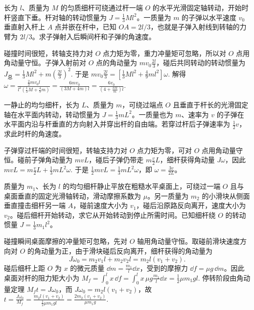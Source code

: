 \documentclass[lang=cn,11pt]{elegantbook}
\begin{document}
\begin{exercise}
长为 \(l\)、质量为 \(M\) 的匀质细杆可绕通过杆一端 \(O\) 的水平光滑固定轴转动，开始时杆竖直下垂。杆对轴的转动惯量为 \(J=\frac13Ml^2\)。一质量为 \(m\) 的子弹以水平速度 \(v_0\) 垂直射入杆上 \(A\) 点并嵌在杆中，已知 \(OA=2l/3\)，也就是子弹入射线到转轴的力臂为 \(2l/3\)。求子弹射入后瞬间杆和子弹的角速度。
\end{exercise}

\begin{solution}
碰撞时间很短，转轴支持力对 \(O\) 点力矩为零，重力冲量矩可忽略，所以对 \(O\) 点用角动量守恒。子弹入射前对 \(O\) 点的角动量为 \(mv_0\frac{2l}{3}\)，碰后共同转动的转动惯量为
 \(J_{\text{总}}=\frac13Ml^2+m\left(\frac{2l}{3}\right)^2.\) 
于是
 \(mv_0\frac{2l}{3} =\left[\frac13Ml^2+\frac49ml^2\right]\omega.\) 
解得
 \(\omega =\frac{\frac23mv_0l}{l^2\left(\frac13M+\frac49m\right)} =\frac{6mv_0}{(3M+4m)l} =\frac{6v_0}{\left(4+\frac{3M}{m}\right)l}.\) 
\end{solution}

\begin{exercise}
一静止的均匀细杆，长为 \(L\)、质量为 \(m\)，可绕过端点 \(O\) 且垂直于杆长的光滑固定轴在水平面内转动，转动惯量为 \(J=\frac13mL^2\)。一质量也为 \(m\)、速率为 \(v\) 的子弹在水平面内沿与杆垂直的方向射入并穿出杆的自由端。若穿过杆后子弹速率为 \(\frac12v\)，求此时杆的角速度。
\end{exercise}

\begin{solution}
子弹穿过杆端的时间很短，转轴支持力对 \(O\) 点力矩为零，可对 \(O\) 点用角动量守恒。碰前子弹角动量为 \(mvL\)，碰后子弹仍带走 \(m\frac{v}{2}L\)，细杆获得角动量 \(J\omega\)，因此
 \(mvL=m\frac{v}{2}L+\frac13mL^2\omega.\) 
于是 \(\frac12mvL=\frac13mL^2\omega\)，即 \(\omega=\frac{3v}{2L}\)。
\end{solution}

\begin{exercise}
质量为 \(m_1\)、长为 \(l\) 的均匀细杆静止平放在粗糙水平桌面上，可绕过一端 \(O\) 且与桌面垂直的固定光滑轴转动，滑动摩擦系数为 \(\mu\)。另一质量为 \(m_2\) 的小滑块从侧面垂直撞击细杆另一端 \(A\)，碰前速度大小为 \(v_1\)，碰后沿原路反向离开，速度大小为 \(v_2\)。碰后细杆开始转动，求它从开始转动到停止所需时间。已知细杆绕 \(O\) 的转动惯量 \(J=\frac13m_1l^2\)。
\end{exercise}

\begin{solution}
碰撞瞬间桌面摩擦的冲量矩可忽略，先对 \(O\) 轴用角动量守恒。取碰前滑块速度方向对 \(O\) 的角动量为正，由于滑块碰后反向离开，细杆获得的角动量为
\[
J\omega_0=m_2v_1l+m_2v_2l=m_2l(v_1+v_2).
\]
碰后细杆上距 \(O\) 为 \(x\) 的微元质量 \(\dd m=\frac{m_1}{l}\dd x\)，受到的摩擦力 \(\dd f=\mu g\,\dd m\)。因此桌面对杆的阻力矩大小为
 \(M_f=\int_0^l x\,\dd f =\int_0^l x\,\mu g\frac{m_1}{l}\dd x =\frac12\mu m_1gl.\) 
停转阶段由角动量定理 \(M_ft=J\omega_0\)，而 \(J\omega_0=m_2l(v_1+v_2)\)，故
 \(t=\frac{J\omega_0}{M_f} =\frac{m_2l(v_1+v_2)}{\frac12\mu m_1gl} =\frac{2m_2(v_1+v_2)}{\mu m_1g}.\) 
\end{solution}
\end{document}
